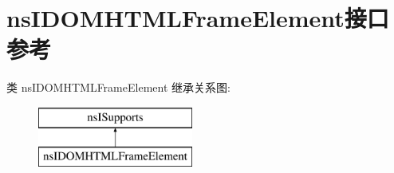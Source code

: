 \hypertarget{interfacens_i_d_o_m_h_t_m_l_frame_element}{}\section{ns\+I\+D\+O\+M\+H\+T\+M\+L\+Frame\+Element接口 参考}
\label{interfacens_i_d_o_m_h_t_m_l_frame_element}
类 ns\+I\+D\+O\+M\+H\+T\+M\+L\+Frame\+Element 继承关系图\+:\begin{figure}[H]
\begin{center}
\leavevmode
\includegraphics[height=2.000000cm]{interfacens_i_d_o_m_h_t_m_l_frame_element}
\end{center}
\end{figure}
